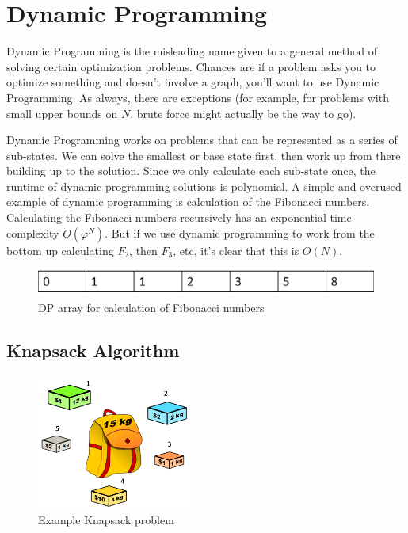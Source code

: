 \chapter{Dynamic Programming}

Dynamic Programming is the misleading name given to a general method of solving certain optimization problems.  Chances are if a problem asks you to optimize something and doesn't involve a graph, you'll want to use Dynamic Programming.  As always, there are exceptions  (for example, for problems with small upper bounds on $N$, brute force might actually be the way to go).

Dynamic Programming works on problems that can be represented as a series of sub-states.  We can solve the smallest or base state first, then work up from there building up to the solution.  Since we only calculate each sub-state once, the runtime of dynamic programming solutions is polynomial.
%
A simple and overused example of dynamic programming is calculation of the Fibonacci numbers.  Calculating the Fibonacci numbers recursively has an exponential time complexity $O(\varphi^N)$.  But if we use dynamic programming to work from the bottom up calculating $F_2$, then $F_3$, etc, it's clear that this is $O(N)$.
%
\begin{figure}[h]
\begin{center}
\includegraphics[width=6in]{images/fib-dp.png}
\end{center}
\caption{DP array for calculation of Fibonacci numbers}
\end{figure}

\section{Knapsack Algorithm}

\begin{figure}[ht]
\begin{center}
\includegraphics[width=2in]{images/knapsack.png}
\end{center}
\caption{Example Knapsack problem}
\label{fig:ihatelarry}
\end{figure}

